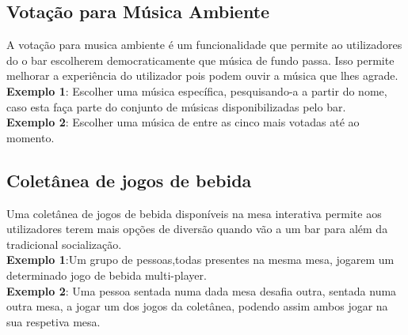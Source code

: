 \documentclass{article}
\begin{document}
\subsection*{Votação para Música Ambiente}
A votação para musica ambiente é um funcionalidade que permite ao utilizadores do o bar escolherem democraticamente que música de fundo passa. Isso permite melhorar a experiência do utilizador pois podem ouvir a música que lhes agrade.\\
\textbf{Exemplo 1}: Escolher uma música específica, pesquisando-a a partir do nome, caso esta faça parte do conjunto de músicas disponibilizadas pelo bar.\\
\textbf{Exemplo 2}: Escolher uma música de entre as cinco mais votadas até ao momento.\\


\subsection*{Coletânea de jogos de bebida}
Uma coletânea de jogos de bebida disponíveis na mesa interativa permite aos utilizadores terem mais opções de diversão quando vão a um bar para além da tradicional socialização.\\
\textbf{Exemplo 1}:Um grupo de pessoas,todas presentes na mesma mesa, jogarem um determinado jogo de bebida multi-player.\\
\textbf{Exemplo 2}: Uma pessoa sentada numa dada mesa desafia outra, sentada numa outra mesa, a jogar um dos jogos da coletânea, podendo assim ambos jogar na sua respetiva mesa.
\end{document}

